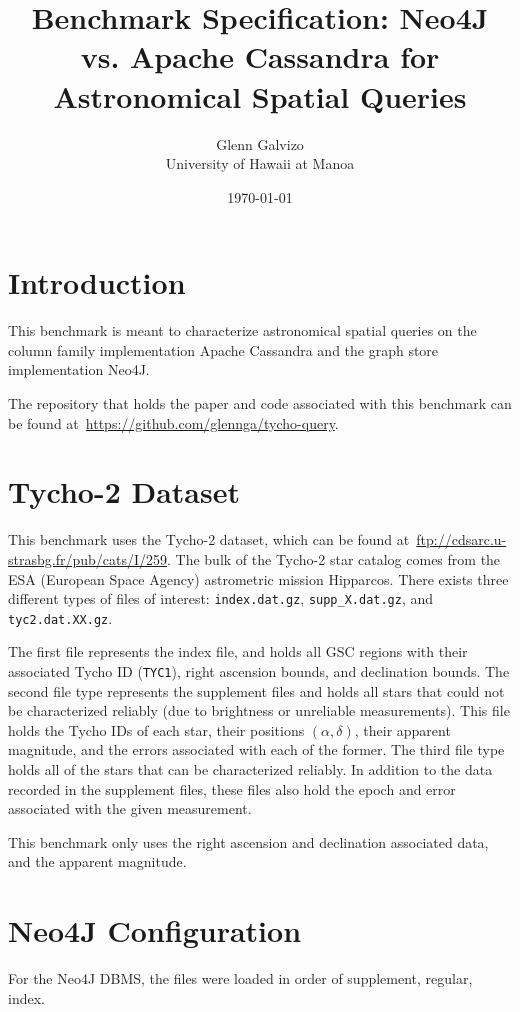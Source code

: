 \documentclass[11pt]{article}
\title{Benchmark Specification: Neo4J vs. Apache Cassandra for Astronomical Spatial Queries}
\author{Glenn Galvizo \\ University of Hawaii at Manoa} \date{\today}
\begin{document}
    \maketitle

    \section{Introduction}\label{sec:introduction}
    This benchmark is meant to characterize astronomical spatial queries on the column family implementation Apache
    Cassandra and the graph store implementation Neo4J\@.

    The repository that holds the paper and code associated with this benchmark can be found
    at~\url{https://github.com/glennga/tycho-query}.

    \section{Tycho-2 Dataset}\label{sec:tycho-2Dataset}
    This benchmark uses the Tycho-2 dataset, which can be found at~\url{ftp://cdsarc.u-strasbg.fr/pub/cats/I/259}.
    The bulk of the Tycho-2 star catalog comes from the ESA (European Space Agency) astrometric mission Hipparcos.
    There exists three different types of files of interest: \texttt{index.dat.gz}, \texttt{supp\_X.dat.gz}, and
    \texttt{tyc2.dat.XX.gz}.

    The first file represents the index file, and holds all GSC regions with their associated Tycho ID (\texttt{TYC1}),
    right ascension bounds, and declination bounds.
    The second file type represents the supplement files and holds all stars that could not be characterized
    reliably (due to brightness or unreliable measurements).
    This file holds the Tycho IDs of each star, their positions $(\alpha, \delta)$, their apparent magnitude, and
    the errors associated with each of the former.
    The third file type holds all of the stars that can be characterized reliably.
    In addition to the data recorded in the supplement files, these files also hold the epoch and error associated with
    the given measurement.

    This benchmark only uses the right ascension and declination associated data, and the apparent magnitude.

    \section{Neo4J Configuration}\label{sec:neo4jConfiguration}
    For the Neo4J DBMS, the files were loaded in order of supplement, regular, index.
\end{document}
